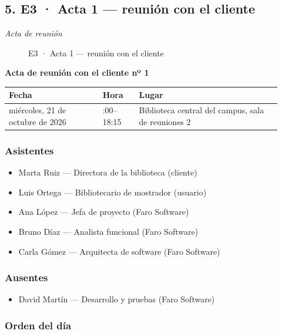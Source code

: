 \subsection*{5. E3 · Acta 1 — reunión con el cliente}

\emph{Acta de reunión}

\begin{figure}[H]
\centering
{}
\caption{E3 · Acta 1 — reunión con el cliente}
\end{figure}

\textbf{Acta de reunión con el cliente nº 1}

{\small
\begin{longtable}{@{}>{\raggedright\arraybackslash}p{0.317\linewidth}>{\raggedright\arraybackslash}p{0.129\linewidth}>{\raggedright\arraybackslash}p{0.478\linewidth}@{}}
\toprule
\textbf{Fecha} & \textbf{Hora} & \textbf{Lugar} \\
\midrule
\endhead
miércoles, 21 de octubre de 2026 & 17:00–18:15 & Biblioteca central del campus, sala de reuniones 2 \\
\bottomrule
\end{longtable}}

\subsubsection*{Asistentes}

\begin{itemize}
\item Marta Ruiz — Directora de la biblioteca (cliente)
\item Luis Ortega — Bibliotecario de mostrador (usuario)
\item Ana López — Jefa de proyecto (Faro Software)
\item Bruno Díaz — Analista funcional (Faro Software)
\item Carla Gómez — Arquitecta de software (Faro Software)
\end{itemize}

\subsubsection*{Ausentes}

\begin{itemize}
\item David Martín — Desarrollo y pruebas (Faro Software)
\end{itemize}

\subsubsection*{Orden del día}

